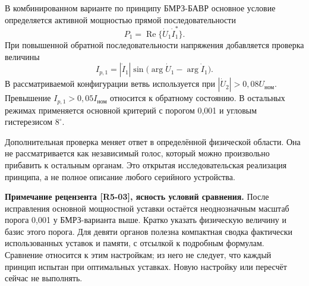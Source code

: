 В комбинированном варианте
по принципу БМРЗ-БАВР
основное условие определяется
активной мощностью
прямой последовательности
\begin{equation}
 P_1=\operatorname{Re}
             \{\dot{U}_1\dot{I}_1^*\}.
 \label{eq:ch5_unbalance_power}
\end{equation}
При повышенной обратной
последовательности напряжения
добавляется проверка величины
\begin{equation}
 I_{p,1}=|\dot{I}_1|
 \sin\bigl(\arg\dot{U}_1-\arg\dot{I}_1\bigr).
 \label{eq:ch5_unbalance_current}
\end{equation}
В рассматриваемой конфигурации
ветвь используется при
$|\dot{U}_2|>0{,}08U_{\text{ном}}$.
Превышение
$I_{p,1}>0{,}05I_{\text{ном}}$
относится к обратному состоянию.
В остальных режимах
применяется основной критерий
с порогом 0,001
и угловым гистерезисом $8^\circ$.

Дополнительная проверка
меняет ответ в определённой
физической области.
Она не рассматривается
как независимый голос,
который можно произвольно
прибавить к остальным органам.
Это открытая исследовательская
реализация принципа,
а не полное описание
любого серийного устройства.

{}


\ifdefined\AuthorReview
\par\smallskip\begingroup\small\raggedright\color{red!60!black}
\noindent\textbf{Примечание рецензента [R5-03], ясность условий сравнения.} После исправления основной мощностной уставки остаётся неоднозначным масштаб порога 0,001 у БМРЗ-варианта выше. Кратко указать физическую величину и базис этого порога. Для девяти органов полезна компактная сводка фактически использованных уставок и памяти, с отсылкой к подробным формулам. Сравнение относится к этим настройкам; из него не следует, что каждый принцип испытан при оптимальных уставках. Новую настройку или пересчёт сейчас не выполнять.\par\endgroup\smallskip
\fi
\ifdefined\AuthorReview
\par{}\smallskip
\fi

{}

